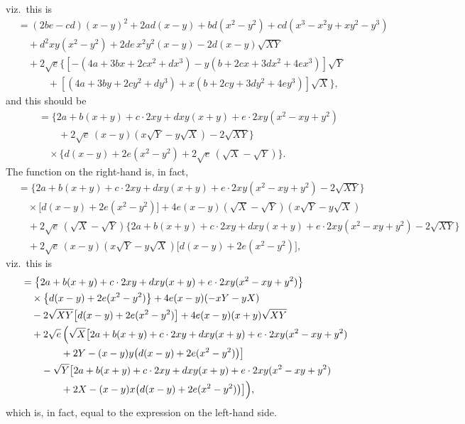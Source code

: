 \documentclass[11pt]{article}
\begin{document}
viz.\ this is
\begin{align*}
&= (2be - cd)(x - y)^2 + 2ad(x - y) + bd(x^2 - y^2) + cd(x^3 - x^2 y + xy^2 - y^3)\\
&\quad + d^2 xy(x^2 - y^2) + 2de\,x^2 y^2(x - y) - 2d(x - y)\sqrt{XY}\\
&\quad + 2\sqrt{e}\bigl\{[-(4a + 3bx + 2cx^2 + dx^3) - y(b + 2cx + 3dx^2 + 4ex^3)]\sqrt{Y}\\
&\qquad\quad + [(4a + 3by + 2cy^2 + dy^3) + x(b + 2cy + 3dy^2 + 4ey^3)]\sqrt{X}\bigr\},
\end{align*}
and this should be
\begin{align*}
&= \bigl\{2a + b(x + y) + c\cdot 2xy + dxy(x + y) + e\cdot 2xy(x^2 - xy + y^2)\\
&\qquad + 2\sqrt{e}\,(x - y)(x\sqrt{Y} - y\sqrt{X}) - 2\sqrt{XY}\bigr\}\\
&\quad\times\bigl\{d(x - y) + 2e(x^2 - y^2) + 2\sqrt{e}\,(\sqrt{X} - \sqrt{Y})\bigr\}.
\end{align*}
The function on the right-hand is, in fact,
\begin{align*}
&= \bigl\{2a + b(x + y) + c\cdot 2xy + dxy(x + y) + e\cdot 2xy(x^2 - xy + y^2) - 2\sqrt{XY}\bigr\}\\
&\quad\times\bigl[d(x - y) + 2e(x^2 - y^2)\bigr] + 4e(x - y)(\sqrt{X} - \sqrt{Y})(x\sqrt{Y} - y\sqrt{X})\\
&\quad + 2\sqrt{e}\,(\sqrt{X} - \sqrt{Y})\bigl\{2a + b(x + y) + c\cdot 2xy + dxy(x + y) + e\cdot 2xy(x^2 - xy + y^2) - 2\sqrt{XY}\bigr\}\\
&\quad + 2\sqrt{e}\,(x - y)(x\sqrt{Y} - y\sqrt{X})\bigl[d(x - y) + 2e(x^2 - y^2)\bigr],
\end{align*}
viz.\ this is
\begin{align*}
&= \bigl\{2a + b(x + y) + c\cdot 2xy + dxy(x + y) + e\cdot 2xy(x^2 - xy + y^2)\bigr\}\\
&\quad\times\bigl\{d(x - y) + 2e(x^2 - y^2)\bigr\} + 4e(x - y)(-xY - yX)\\
&\quad - 2\sqrt{XY}\bigl[d(x - y) + 2e(x^2 - y^2)\bigr] + 4e(x - y)(x + y)\sqrt{XY}\\
&\quad + 2\sqrt{e}\,\Bigl(\sqrt{X}\bigl[2a + b(x + y) + c\cdot 2xy + dxy(x + y) + e\cdot 2xy(x^2 - xy + y^2)\\
&\qquad\qquad + 2Y - (x - y)y\bigl(d(x - y) + 2e(x^2 - y^2)\bigr)\bigr]\\
&\qquad - \sqrt{Y}\bigl[2a + b(x + y) + c\cdot 2xy + dxy(x + y) + e\cdot 2xy(x^2 - xy + y^2)\\
&\qquad\qquad + 2X - (x - y)x\bigl(d(x - y) + 2e(x^2 - y^2)\bigr)\bigr]\Bigr),
\end{align*}
which is, in fact, equal to the expression on the left-hand side.
\end{document}

